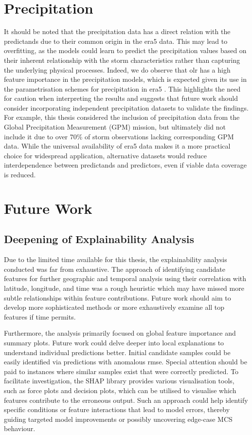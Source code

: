\section{Precipitation}

It should be noted that the precipitation data has a direct relation with the predictands due to their common origin in the \acrshort{era5} data. This may lead to overfitting, as the models could learn to predict the precipitation values based on their inherent relationship with the storm characteristics rather than capturing the underlying physical processes. Indeed, we do observe that \acrshort{olr} has a high feature importance in the precipitation models, which is expected given its use in the parametrisation schemes for precipitation in \acrshort{era5} \citep{Hersbach2020}. This highlights the need for caution when interpreting the results and suggests that future work should consider incorporating independent precipitation datasets to validate the findings. For example, this thesis considered the inclusion of precipitation data from the Global Precipitation Measurement (GPM) mission, but ultimately did not include it due to over 70\% of storm observations lacking corresponding GPM data. While the universal availability of \acrshort{era5} data makes it a more practical choice for widespread application, alternative datasets would reduce interdependence between predictands and predictors, even if viable data coverage is reduced.

\section{Future Work}

\subsection{Deepening of Explainability Analysis}

Due to the limited time available for this thesis, the explainability analysis conducted was far from exhaustive. The approach of identifying candidate features for further geographic and temporal analysis using their correlation with latitude, longitude, and time was a rough heuristic which may have missed more subtle relationships within feature contributions. Future work should aim to develop more sophisticated methods or more exhaustively examine all top features if time permits.

Furthermore, the analysis primarily focused on global feature importance and summary plots. Future work could delve deeper into local explanations to understand individual predictions better. Initial candidate samples could be easily identified via predictions with anomalous \acrshort{rmse}. Special attention should be paid to instances where similar samples exist that were correctly predicted. To facilitate investigation, the SHAP library provides various visualisation tools, such as force plots and decision plots, which can be utilised to visualise which features contribute to the erroneous output. Such an approach could help identify specific conditions or feature interactions that lead to model errors, thereby guiding targeted model improvements or possibly uncovering edge-case MCS behaviour.

